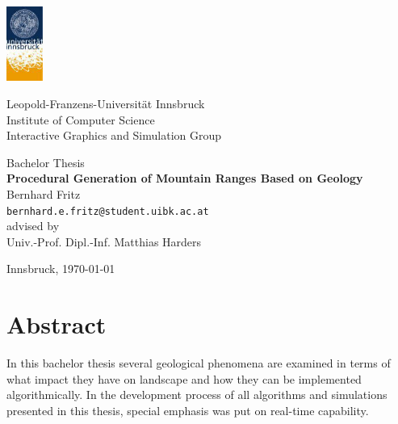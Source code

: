\documentclass[11pt,a4paper,twoside,openright]{report}
\begin{document}

\begin{titlepage} %

\begin{center}
\includegraphics[width=1.2cm]{images/uibk}

\begin{large}
Leopold-Franzens-Universität Innsbruck\\[5mm]
Institute of Computer Science\\
Interactive Graphics and Simulation Group\\[25mm]
\end{large}

Bachelor Thesis\\[15mm]

{\LARGE \bf Procedural Generation of Mountain Ranges Based on Geology}\\[15mm]

Bernhard Fritz\\
\texttt{bernhard.e.fritz@student.uibk.ac.at}\\[35mm]

advised by\\
Univ.-Prof. Dipl.-Inf. Matthias Harders\\[10mm]

\vfill

Innsbruck, \today
\end{center}

\end{titlepage}





\chapter*{Abstract}
In this bachelor thesis several geological phenomena are examined in terms of what impact they have on landscape and how they can be implemented algorithmically. In the development process of all algorithms and simulations presented in this thesis, special emphasis was put on real-time capability.
\end{document}
